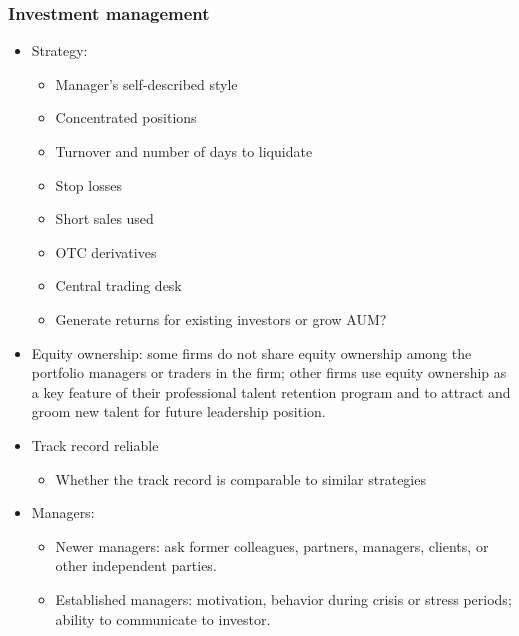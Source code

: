 \subsubsection{Investment management}
\begin{itemize}
\item Strategy:
    \begin{itemize}
    \item Manager's self-described style
    \item Concentrated positions
    \item Turnover and number of days to liquidate
    \item Stop losses
    \item Short sales used
    \item OTC derivatives
    \item Central trading desk
    \item Generate returns for existing investors or grow AUM?
    \end{itemize}
    
\item Equity ownership: some firms do not share equity ownership among the portfolio managers or traders in the firm; other firms use equity ownership as a key feature of their professional talent retention program and to attract and groom new talent for future leadership position.


\item Track record reliable
    \begin{itemize}
    \item Whether the track record is comparable to similar strategies
    \end{itemize}
    
\item Managers:
    \begin{itemize}
    \item Newer managers: ask former colleagues, partners, managers, clients, or other independent parties.
    \item Established managers: motivation, behavior during crisis or stress periods; ability to communicate to investor.
    \end{itemize}
    

\end{itemize}



